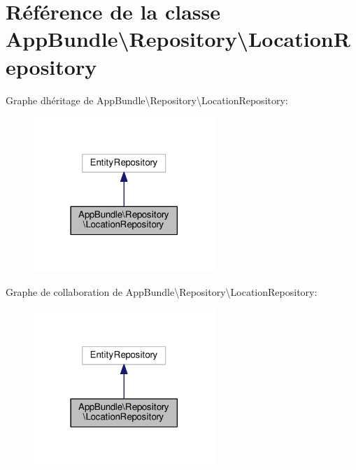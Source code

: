 \hypertarget{classAppBundle_1_1Repository_1_1LocationRepository}{}\section{Référence de la classe App\+Bundle\textbackslash{}Repository\textbackslash{}Location\+Repository}
\label{classAppBundle_1_1Repository_1_1LocationRepository}


Graphe d\textquotesingle{}héritage de App\+Bundle\textbackslash{}Repository\textbackslash{}Location\+Repository\+:\nopagebreak
\begin{figure}[H]
\begin{center}
\leavevmode
\includegraphics[width=194pt]{classAppBundle_1_1Repository_1_1LocationRepository__inherit__graph}
\end{center}
\end{figure}


Graphe de collaboration de App\+Bundle\textbackslash{}Repository\textbackslash{}Location\+Repository\+:\nopagebreak
\begin{figure}[H]
\begin{center}
\leavevmode
\includegraphics[width=194pt]{classAppBundle_1_1Repository_1_1LocationRepository__coll__graph}
\end{center}
\end{figure}


